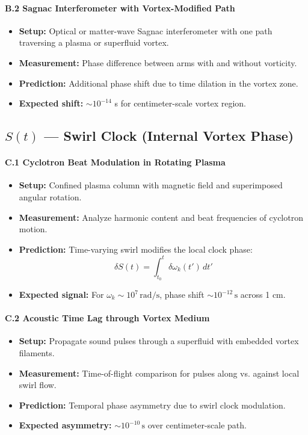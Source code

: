 \paragraph{B.2 Sagnac Interferometer with Vortex-Modified Path}
\begin{itemize}
    \item \textbf{Setup:} Optical or matter-wave Sagnac interferometer with one path traversing a plasma or superfluid vortex.
    \item \textbf{Measurement:} Phase difference between arms with and without vorticity.
    \item \textbf{Prediction:} Additional phase shift due to time dilation in the vortex zone.
    \item \textbf{Expected shift:} \(\sim 10^{-14}\) s for centimeter-scale vortex region.
\end{itemize}

\subsection*{\(S(t)\) --- Swirl Clock (Internal Vortex Phase)}

\paragraph{C.1 Cyclotron Beat Modulation in Rotating Plasma}
\begin{itemize}
    \item \textbf{Setup:} Confined plasma column with magnetic field and superimposed angular rotation.
    \item \textbf{Measurement:} Analyze harmonic content and beat frequencies of cyclotron motion.
    \item \textbf{Prediction:} Time-varying swirl modifies the local clock phase:
    \[
        \delta S(t) = \int_{t_0}^{t} \delta \omega_k(t') \, dt'
    \]
    \item \textbf{Expected signal:} For \( \omega_k \sim 10^7 \, \mathrm{rad/s} \), phase shift \( \sim 10^{-12} \, \mathrm{s} \) across 1 cm.
\end{itemize}

\paragraph{C.2 Acoustic Time Lag through Vortex Medium}
\begin{itemize}
    \item \textbf{Setup:} Propagate sound pulses through a superfluid with embedded vortex filaments.
    \item \textbf{Measurement:} Time-of-flight comparison for pulses along vs. against local swirl flow.
    \item \textbf{Prediction:} Temporal phase asymmetry due to swirl clock modulation.
    \item \textbf{Expected asymmetry:} \( \sim 10^{-10} \, \mathrm{s} \) over centimeter-scale path.
\end{itemize}

